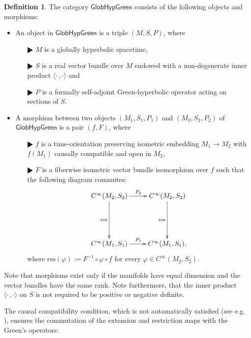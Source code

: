 \documentclass[a4paper,11pt]{amsart}
\theoremstyle{definition}
\newtheorem{definition}[thm]{Definition}
\begin{document}
\begin{definition}\label{def:GHG}
The category ${\mathsf{GlobHypGreen}}$ consists of the following objects and morphisms:
\begin{itemize}\item An object in ${\mathsf{GlobHypGreen}}$ is a triple $(M,S,P)$, where 
\begin{itemize}\item[$\RHD$]
$M$ is a globally hyperbolic spacetime, 
\item[$\RHD$]
$S$ is a real vector bundle over $M$ endowed with a non-degenerate inner product ${\langle}\cdot\,,\cdot{\rangle}$ and 
\item[$\RHD$]
$P$ is a formally self-adjoint Green-hyperbolic operator acting on sections of $S$.
\end{itemize}
\item A morphism between two objects $(M_1,S_1,P_1)$ and $(M_2,S_2,P_2)$ of ${\mathsf{GlobHypGreen}}$ is a pair $(f,F)$, where 
\begin{itemize}\item[$\RHD$] 
$f$ is a time-orientation preserving isometric embedding $M_1\rightarrow M_2$ with $f(M_1)$ causally compatible and open in $M_2$, 
\item[$\RHD$] 
$F$ is a fiberwise isometric vector bundle isomorphism over $f$ such that the following diagram commutes:
\begin{equation}\label{diag:restrictD}
\xymatrix{{C^\infty}(M_2,S_2)\ar[r]^{P_2}\ar[dd]_{\mathrm{res}}&{C^\infty}(M_2,S_2)\ar[dd]_{\mathrm{res}}\\ &\\ {C^\infty}(M_1,S_1)\ar[r]^{P_1} &{C^\infty}(M_1,S_1),}
\end{equation}
where ${\mathrm{res}}({\varphi}):=F^{-1}\circ{\varphi}\circ f$ for every ${\varphi}\in {C^\infty}(M_2,S_2)$. 
\end{itemize}
\end{itemize}
\end{definition}

Note that morphisms exist only if the manifolds have equal dimension and the vector bundles have the same rank. 
Note furthermore, that the inner product ${\langle}\cdot\,,\cdot{\rangle}$ on $S$ is not required to be positive or negative definite.

The causal compatibility condition, which is not automatically satisfied (see e.g. \cite[Fig. 33]{BGP}), ensures the commutation of the extension and restriction maps with the Green's operators:
\end{document}
